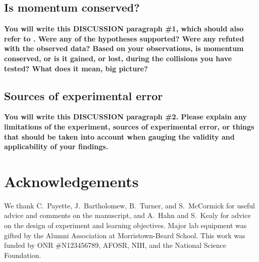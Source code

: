 \documentclass[aps,prl,preprint]{revtex4-1}
\begin{document}
\subsection{Is momentum conserved?}
\textbf{You will write this DISCUSSION paragraph \#1, which should also refer to .  Were any of the hypotheses supported? Were any refuted with the observed data? Based on your observations, is momentum conserved, or is it gained, or lost, during the collisions you have tested? What does it mean, big picture?}

\subsection{Sources of experimental error}
\textbf{You will write this DISCUSSION paragraph \#2. Please explain any limitations of the experiment, sources of experimental error, or things that should be taken into account when gauging the validity and applicability of your findings.}

\section{Acknowledgements}
We thank C.~Payette, J.~Bartholomew, B.~Turner, and S.~McCormick for useful advice and comments on the manuscript, and A.~Hahn and S.~Kealy for advice on the design of experiment and learning objectives. Major lab equipment was gifted by the Alumni Association at Morristown-Beard School. This work was funded by ONR \#N123456789, AFOSR, NIH, and the National Science Foundation. 

\end{document}
